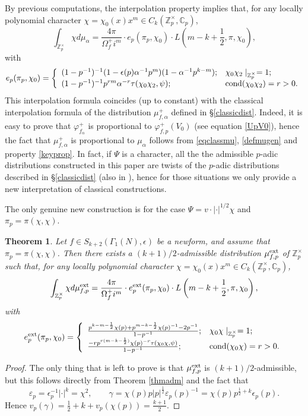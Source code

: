\documentclass{amsart}
\newtheorem{thm0}[defn0]{Theorem}
\newenvironment{theorem}{\begin{thm0}}{\end{thm0}}
\newcommand{\Z}{{\mathbb Z}}
\newcommand{\C}{{\mathbb C}}
\begin{document}
By previous computations, the interpolation property implies that, for any locally polynomial character $\chi=\chi_0(x)x^m\in C_k(\Z_p^\times,\C_p)$,
\[
\int_{\Z_p^\times}\chi d\mu_\alpha=\frac{4\pi }{\Omega_f^+i^m}\cdot e_p(\pi_p,\chi_0)\cdot L\left(m-k+\frac{1}{2},\pi,\chi_0\right),
\]
with
\[
e_p(\pi_p,\chi_0)=\left\{\begin{array}{ll}
(1-p^{-1})^{-1}(1-\epsilon(p)\alpha^{-1} p^{m})(1-\alpha^{-1}p^{k-m});&\chi_0\chi_2\mid_{\Z_p^\times}=1;\\
(1-p^{-1})^{-1}p^{rm}\alpha^{-r}\tau(\chi_0\chi_2,\psi);&{\rm cond}(\chi_0\chi_2)=r>0.
\end{array}\right.
\]
This interpolation formula coincides (up to constant) with the classical interpolation formula of the distribution $\mu_{f,\alpha}^+$ defined in \S \ref{classicdist}. Indeed, it is easy to prove that $\varphi^+_{f_\alpha}$ is proportional to $\varphi_{f,p}^+(V_0)$ (see equation \eqref{UpV0}), hence the fact that $\mu_{f,\alpha}^+$ is proportional to $\mu_{\alpha}$ follows from \eqref{eqclassmu}, \eqref{defmugen} and property \eqref{keyprop}. 
In fact, if $\Psi$ is a character, all the the admissible $p$-adic distributions constructed in this paper are twists of the $p$-adic distributions described in \S \ref{classicdist} (also in \cite{MTT86}), hence for those situations we only provide a new interpretation of classical constructions.

The only genuine new construction is for the case $\Psi=v\cdot|\cdot|^{1/2}\chi$ and $\pi_p=\pi(\chi,\chi)$.
\begin{theorem}\label{mainthm}
Let $f\in S_{k+2}(\Gamma_1(N),\epsilon)$ be a newform, and assume that $\pi_p=\pi(\chi,\chi)$. Then there exists a $(k+1)/2$-admissible distribution $\mu_{f,p}^{\rm ext}$ of $\Z_p^\times$ such that, for any locally polynomial character $\chi=\chi_0(x)x^m\in C_k(\Z_p^\times,\C_p)$,
\[
\int_{\Z_p^\times}\chi d\mu_{f,p}^{\rm ext}=\frac{4\pi }{\Omega_f^+i^m}\cdot e_p^{\rm ext}(\pi_p,\chi_0)\cdot L\left(m-k+\frac{1}{2},\pi,\chi_0\right),
\]
with
\[
e_p^{\rm ext}(\pi_p,\chi_0)=\left\{\begin{array}{ll}
\frac{p^{k-m-\frac{1}{2}}\chi(p)+p^{m-k-\frac{1}{2}}\chi(p)^{-1}-2p^{-1}}{1-p^{-1}};&\chi_0\chi\mid_{\Z_p^\times}=1;\\
\frac{-rp^{r(m-k-\frac{1}{2})}\chi(p)^{-r}\tau(\chi_0\chi,\psi)}{1-p^{-1}};&{\rm cond}(\chi_0\chi)=r>0.
\end{array}\right.
\]
\end{theorem}
\begin{proof}
The only thing that is left to prove is that $\mu_{f,p}^{\rm ext}$ is $(k+1)/2$-admissible, but this follows directly from Theorem \ref{thmadm} and the fact that 
\[
\varepsilon_p=\epsilon_p^{-1}|\cdot|^k=\chi^2,\qquad\gamma=\chi(p)p|p|^{\frac{1}{2}}\varepsilon_p(p)^{-1}=\chi(p)p^{\frac{1}{2}+k}\epsilon_p(p).
\]
Hence $v_p(\gamma)=\frac{1}{2}+k+v_p(\chi(p))=\frac{k+1}{2}$.
\end{proof}
\end{document}
